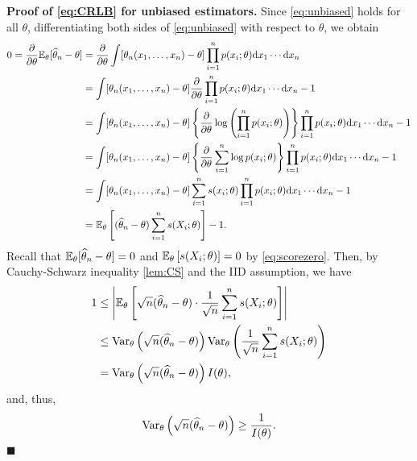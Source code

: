 \documentclass[11pt, A4paper, openany, uplatex]{book}
\begin{document}
\textbf{Proof of \eqref{eq:CRLB} for unbiased estimators.} \quad Since \eqref{eq:unbiased} holds for all $\theta$, differentiating both sides of \eqref{eq:unbiased} with respect to $\theta$, we obtain
\begin{align*}
	0 = \frac{\partial }{\partial \theta}\mathbb{E}_\theta[\widehat \theta_n - \theta]
	& = \frac{\partial}{\partial \theta} \int [\theta_n(x_1, \ldots , x_n) - \theta] \prod_{i=1}^n p(x_i; \theta) \mathrm{d}x_1 \cdots  \mathrm{d}x_n\\
	& = \int [\theta_n(x_1, \ldots , x_n) - \theta] \frac{\partial}{\partial \theta} \prod_{i=1}^n p(x_i; \theta) \mathrm{d}x_1 \cdots  \mathrm{d}x_n - 1\\
	& = \int [\theta_n(x_1, \ldots , x_n) - \theta]  \left\{ \frac{\partial}{\partial \theta} \log\left( \prod_{i=1}^n p(x_i; \theta) \right) \right\} \prod_{i=1}^n p(x_i; \theta) \mathrm{d}x_1 \cdots  \mathrm{d}x_n - 1 \\
	& = \int [\theta_n(x_1, \ldots , x_n) - \theta]  \left\{\frac{\partial}{\partial \theta}\sum_{i=1}^n  \log p(x_i; \theta) \right\}\prod_{i=1}^n p(x_i; \theta) \mathrm{d}x_1 \cdots  \mathrm{d}x_n - 1 \\
	& = \int [\theta_n(x_1, \ldots , x_n) - \theta]  \sum_{i=1}^n s(x_i; \theta) \prod_{i=1}^n p(x_i; \theta) \mathrm{d}x_1 \cdots  \mathrm{d}x_n - 1\\
	& = \mathbb{E}_\theta\left[ (\widehat \theta_n- \theta)  \sum_{i=1}^n s(X_i; \theta)  \right] - 1.
\end{align*}
Recall that $\mathbb{E}_\theta[\widehat \theta_n- \theta] = 0$ and $\mathbb{E}_\theta\left[ s(X_i; \theta)  \right] = 0$ by \eqref{eq:scorezero}.
Then, by Cauchy-Schwarz inequality \ref{lem:CS} and the IID assumption, we have
\begin{align*}
	1 
	& \le \left| \mathbb{E}_\theta\left[ \sqrt{n}(\widehat \theta_n- \theta) \cdot \frac{1}{\sqrt{n}}  \sum_{i=1}^n s(X_i; \theta)  \right] \right|\\
	& \le \mathrm{Var}_\theta\left( \sqrt{n}(\widehat \theta_n- \theta) \right) \mathrm{Var}_\theta\left(\frac{1}{\sqrt{n}}\sum_{i=1}^n s(X_i; \theta) \right)\\
	& = \mathrm{Var}_\theta\left(\sqrt{n}(\widehat \theta_n- \theta) \right) I(\theta),
\end{align*}
and, thus,
\[
	\mathrm{Var}_\theta\left(\sqrt{n}(\widehat \theta_n- \theta) \right) \ge \frac{1}{I(\theta)}.
\]
$\blacksquare$
\end{document}
